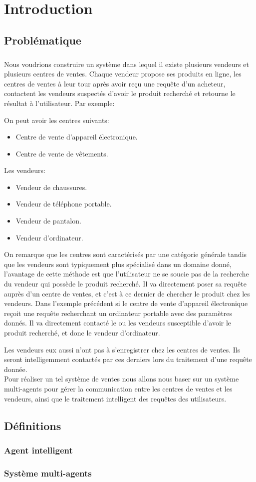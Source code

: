 \chapter{Introduction}
\section{Problématique}
\paragraph{}
Nous voudrions construire un système dans lequel il existe plusieurs vendeurs et plusieurs centres de ventes. Chaque vendeur propose ses produits en ligne, les centres de ventes à leur tour après avoir reçu une requête d’un acheteur, contactent les vendeurs suspectés d’avoir le produit recherché et retourne le résultat à l’utilisateur. Par exemple: 

On peut avoir les centres suivants:
\begin{itemize}
	\item Centre de vente d’appareil électronique.
	\item Centre de vente de vêtements.
\end{itemize}
Les vendeurs:
\begin{itemize}
	\item Vendeur de chaussures.
	\item Vendeur de téléphone portable.
	\item Vendeur de pantalon.
	\item Vendeur d’ordinateur.
\end{itemize}
On remarque que les centres sont caractérisés par une catégorie générale tandis que les vendeurs sont typiquement plus spécialisé dans un domaine donné, l’avantage de cette méthode est que l’utilisateur ne se soucie pas de la recherche du vendeur qui possède le produit recherché. Il va directement poser sa requête auprès d’un centre de ventes, et c’est à ce dernier de chercher le produit chez les vendeurs. Dans l’exemple précédent si le centre de vente d’appareil électronique reçoit une requête recherchant un ordinateur portable avec des paramètres donnés. Il va directement contacté le ou les vendeurs susceptible d’avoir le produit recherché, et donc le vendeur d’ordinateur.

Les vendeurs eux aussi n’ont pas à s’enregistrer chez les centres de ventes. Ils seront intelligemment contactés par ces derniers lors du traitement d’une requête donnée.\\
Pour réaliser un tel système de ventes nous allons nous baser sur un système multi-agents pour gérer la communication entre les centres de ventes et les vendeurs, ainsi que le traitement intelligent des requêtes des utilisateurs.
\section{Définitions}
\subsection{Agent intelligent}
\subsection{Système multi-agents}

